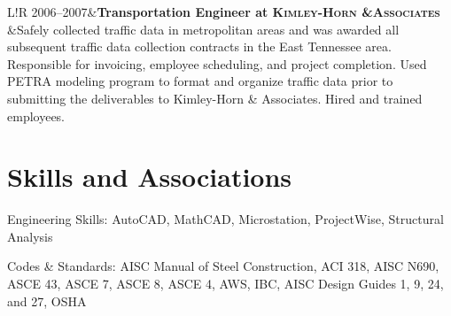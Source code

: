 \documentclass[11pt,letterpaper]{article}
\newcommand\VRule{\color{lightgray}\vrule width 0.5pt}
\begin{document}
\begin{tabular}{L!{\VRule}R}
2006--2007&{\bf Transportation Engineer at \fontsize{12}{12}\textsc{Kimley-Horn \&Associates}}\\
&Safely collected traffic data in metropolitan areas and was awarded all subsequent traffic data collection contracts in the East Tennessee area.
Responsible for invoicing, employee scheduling, and project completion.
Used PETRA modeling program to format and organize traffic data prior to submitting the deliverables to Kimley-Horn \& Associates. 
Hired and trained employees.
\par\vspace{0.3em} 
\end{tabular}

\section*{Skills and Associations}
\begin{description*}
	\item[Engineering Skills:]
	AutoCAD, MathCAD, Microstation, ProjectWise, Structural Analysis
	\\[5pt]
	\item[Codes \& Standards:]
	AISC Manual of Steel Construction, ACI 318, AISC N690, ASCE 43, ASCE 7, ASCE 8, ASCE 4, AWS, IBC, AISC Design Guides 1, 9, 24, and 27, OSHA\\[5pt]
	\end{description*}
\end{document}
